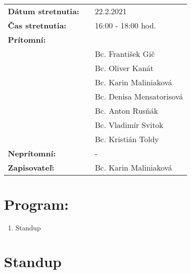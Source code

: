 \documentclass{article}
\begin{document}
    

    \begin{table}[h]
        \begin{tabular}{lllll}
            \multicolumn{3}{l}{\textbf{Dátum stretnutia:}} & & 22.2.2021 \\
            \multicolumn{3}{l}{\textbf{Čas stretnutia:}} & & 16:00 - 18:00 hod. \\
            \multicolumn{3}{l}{\textbf{Prítomní:}} \\
            & & & & Bc. František Gič  \\
            & & & & Bc. Oliver Kanát \\
            & & & & Bc. Karin Maliniaková \\
            & & & & Bc. Denisa Mensatorisová \\
            & & & & Bc. Anton Rusňák \\
            & & & & Bc. Vladimír Svitok \\
            & & & & Bc. Kristián Toldy \\
            \multicolumn{3}{l}{\textbf{Neprítomní:}} & & -\\
            \multicolumn{3}{l}{\textbf{Zapisovateľ:}} & & Bc. Karin Maliniaková \\
        \end{tabular}
        \label{tab:grades}
    \end{table}

    \section*{Program:}

    \begin{enumerate}
        \item Standup
    \end{enumerate}

    \section*{Standup}
\end{document}
